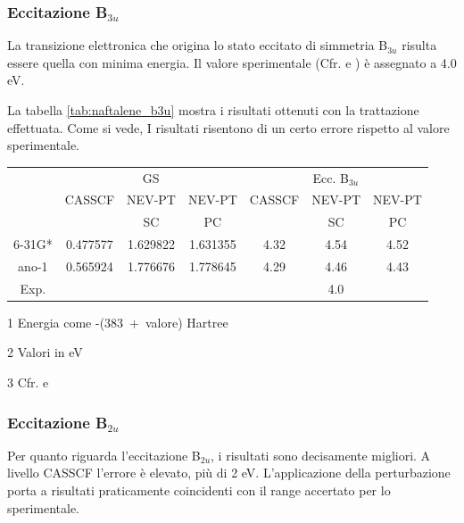 \subsubsection{Eccitazione B$_{3u}$}

La transizione elettronica che origina lo stato eccitato di simmetria
B$_{3u}$ risulta essere quella con minima energia. Il valore sperimentale
(Cfr. \cite{cpl-16-1972-464} e \cite{jms-26-1968-67}) \`e assegnato a 4.0 eV.

La tabella \ref{tab:naftalene_b3u} mostra i risultati ottenuti con la
trattazione effettuata. Come si vede, I risultati risentono di un certo
errore rispetto al valore sperimentale.
\begin{center}
\begin{threeparttable}
\caption{\small Naftalene - Energia della transizione di simmetria B$_{3u}$. CAS
10/10 su basi differenti}
\label{tab:naftalene_b3u}
{
\begin{tabular}{|c|ccc|ccc|}
\hline
\small
 				& \multicolumn{3}{c|}{GS\tnote{1}}				& \multicolumn{3}{c|}{Ecc. B$_{3u}$\tnote{2}} \\
				& CASSCF		& NEV-PT		& NEV-PT		& CASSCF		& NEV-PT	& NEV-PT \\
				&				& SC			& PC			& 				& SC		& PC	 \\
\hline
6-31G*			& 0.477577		& 1.629822		& 1.631355		& 4.32			& 4.54		& 4.52	\\
ano-1			& 0.565924		& 1.776676		& 1.778645		& 4.29			& 4.46		& 4.43	\\
\hline
\hline
Exp.\tnote{3}	&				& 				&				& \multicolumn{3}{c|}{4.0} \\
\hline
\end{tabular}
}
\begin{tablenotes}
\small
 \item[1] Energia come \mbox{-(383 + valore)} Hartree
 \item[2] Valori in eV
 \item[3] Cfr. \cite{cpl-16-1972-464} e \cite{jms-26-1968-67}
\end{tablenotes}
\end{threeparttable}
\end{center}


\subsubsection{Eccitazione B$_{2u}$}

Per quanto riguarda l'eccitazione B$_{2u}$, i risultati sono decisamente
migliori. A livello CASSCF l'errore \`e elevato, pi\`u di 2 eV. L'applicazione
della perturbazione porta a risultati praticamente coincidenti con il range
accertato per lo sperimentale.


